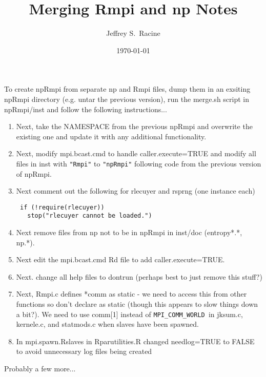 \documentclass[11pt]{amsart}
\title{Merging Rmpi and np Notes}
\author{Jeffrey S.~Racine}
\date{\today}
\begin{document}
\maketitle

\onehalfspacing

To create npRmpi from separate np and Rmpi files, dump them in an
exsiting npRmpi directory (e.g. untar the previous version), run the merge.sh script in npRmpi/inst and follow
the following instructions...

\begin{enumerate}

\item Next, take the NAMESPACE from the previous npRmpi and overwrite
  the existing one and update it with any additional functionality.

\item Next, modify mpi.bcast.cmd to handle caller.execute=TRUE and
  modify all files in inst with \verb+"Rmpi"+ to \verb+"npRmpi"+ following code from the previous version of npRmpi.

\item Next comment out the following for rlecuyer and rsprng (one
  instance each)

\begin{verbatim}
 if (!require(rlecuyer)) 
   stop("rlecuyer cannot be loaded.")
\end{verbatim}

\item Next remove files from np not to be in npRmpi in inst/doc
  (entropy*.*, np.*).

\item Next edit the mpi.bcast.cmd Rd file to add caller.execute=TRUE.

\item Next. change all help files to dontrun (perhaps best to just
  remove this stuff?)

\item Next, Rmpi.c defines *comm as static - we need to access this
  from other functions so don't declare as static (though this appears
  to slow things down a bit?). We need to use comm[1] instead of
  \verb+MPI_COMM_WORLD +in jksum.c, kernele.c, and statmods.c when slaves
  have been spawned.

\item In mpi.spawn.Rslaves in Rparutilities.R changed needlog=TRUE to
  FALSE to avoid unnecessary log files being created

\end{enumerate}

Probably a few more...
\end{document}
